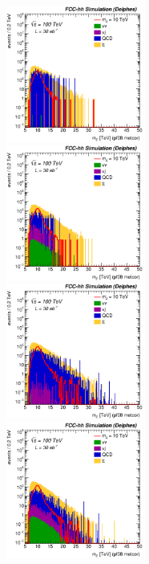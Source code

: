 \documentclass{cernrep}
\begin{document}
\begin{figure}[!htb]
\begin{figure}[!htb]\centering
\includegraphics[width=0.495\textwidth]{Fig/Zptt/Mj1j2_pf08_MetCorr_sel5_nostack_log.eps}
\includegraphics[width=0.495\textwidth]{Fig/Zptt/Mj1j2_pf08_MetCorr_sel6_nostack_log.eps}
\includegraphics[width=0.495\textwidth]{Fig/Zptt/Mj1j2_pf08_MetCorr_sel7_nostack_log.eps}
\includegraphics[width=0.495\textwidth]{Fig/Zptt/Mj1j2_pf08_MetCorr_sel8_nostack_log.eps}

\end{figure}
\end{figure}
\end{document}
